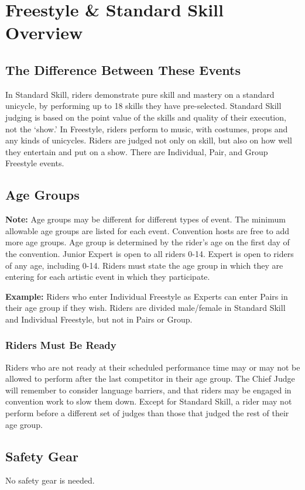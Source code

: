 \chapter{Freestyle \& Standard Skill \label{chap:freestyle} Overview}

\section{The Difference Between These Events}
In Standard Skill, riders demonstrate pure skill and mastery on a standard unicycle, by performing up to 18 skills they have pre-selected.
Standard Skill judging is based on the point value of the skills and quality of their execution, not the `show.' In Freestyle, riders perform to music, with costumes, props and any kinds of unicycles.
Riders are judged not only on skill, but also on how well they entertain and put on a show.
There are Individual, Pair, and Group Freestyle events.

\section{Age Groups}
\textbf{Note:} Age groups may be different for different types of event.
The minimum allowable age groups are listed for each event.
Convention hosts are free to add more age groups.
Age group is determined by the rider's age on the first day of the convention.
Junior Expert is open to all riders 0-14.
Expert is open to riders of any age, including 0-14.
Riders must state the age group in which they are entering for each artistic event in which they participate.

\textbf{Example:} Riders who enter Individual Freestyle as Experts can enter Pairs in their age group if they wish.
Riders are divided male/female in Standard Skill and Individual Freestyle, but not in Pairs or Group.

\subsection{Riders Must Be Ready}
Riders who are not ready at their scheduled performance time may or may not be allowed to perform after the last competitor in their age group.
The Chief Judge will remember to consider language barriers, and that riders may be engaged in convention work to slow them down.
Except for Standard Skill, a rider may not perform before a different set of judges than those that judged the rest of their age group.

\section{Safety Gear}
No safety gear is needed.

